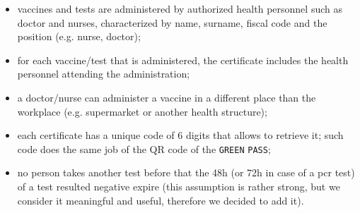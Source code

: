 \documentclass{article}
\begin{document}
\begin{itemize}
\begin{enumerate}
\end{enumerate}
\item vaccines and tests are administered by authorized health personnel such as doctor and nurses, characterized by name, surname, fiscal code and the position (e.g. nurse, doctor);
\item for each vaccine/test that is administered, the certificate includes the health personnel attending the administration;
\item a doctor/nurse can administer a vaccine in a different place than the workplace (e.g. supermarket or another health structure);
\item each certificate has a unique code of 6 digits that allows to retrieve it; such code does the same job of the QR code of the \verb|GREEN| \verb|PASS|;
\item no person takes another test before that the 48h (or 72h in case of a pcr test) of a test resulted negative expire (this assumption is rather strong, but we consider it meaningful and useful, therefore we decided to add it).
\end{itemize}
\newpage
\end{document}
